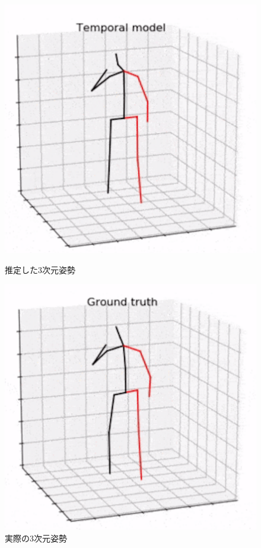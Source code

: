 \documentclass[a4j, fleqn, 12pt]{jsreport}
\begin{document}
\begin{figure}[ht]
\begin{minipage}{0.32\hsize}
            \includegraphics[width=1\hsize]{images/videopose3d.png}
            \caption{推定した3次元姿勢}
            \label{fig:videopose3d}
        \end{minipage}
        \begin{minipage}{0.32\hsize}
            \centering
            \includegraphics[width=1\hsize]{images/3d.png}
            \caption{実際の3次元姿勢}
            \label{fig:3d}
        \end{minipage}
    \end{figure}
\end{document}
